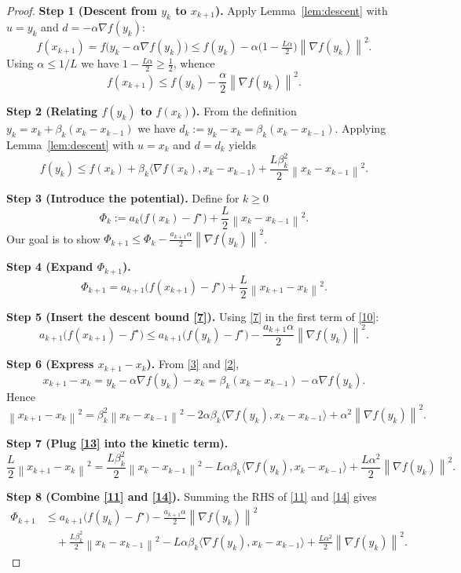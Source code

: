 \documentclass{article}
\newcommand{\norm}[1]{\left\lVert#1\right\rVert}
\newcommand{\grad}{\nabla}
\begin{document}
\begin{proof}
\textbf{Step 1 (Descent from $y_k$ to $x_{k+1}$).}  
Apply Lemma~\ref{lem:descent} with $u=y_k$ and $d=-\alpha\grad f(y_k)$:
\[
f(x_{k+1})
= f\bigl(y_k-\alpha\grad f(y_k)\bigr)
\le f(y_k)-\alpha\bigl(1-\tfrac{L\alpha}{2}\bigr)\norm{\grad f(y_k)}^{2}.
\tag{6}
\]
Using $\alpha\le 1/L$ we have $1-\frac{L\alpha}{2}\ge\frac12$, whence
\[
f(x_{k+1})\le f(y_k)-\frac{\alpha}{2}\norm{\grad f(y_k)}^{2}.
\tag{7}
\]

\textbf{Step 2 (Relating $f(y_k)$ to $f(x_k)$).}  
From the definition $y_k=x_k+\beta_k(x_k-x_{k-1})$ we have
$d_k:=y_k-x_k=\beta_k(x_k-x_{k-1})$.  Applying Lemma~\ref{lem:descent} with
$u=x_k$ and $d=d_k$ yields
\[
f(y_k)\le f(x_k)+\beta_k\langle\grad f(x_k),x_k-x_{k-1}\rangle
+\frac{L\beta_k^{2}}{2}\norm{x_k-x_{k-1}}^{2}.
\tag{8}
\]

\textbf{Step 3 (Introduce the potential).}  
Define for $k\ge0$
\[
\Phi_k:=a_k\bigl(f(x_k)-f^\star\bigr)+\frac{L}{2}\norm{x_k-x_{k-1}}^{2}.
\tag{9}
\]
Our goal is to show $\Phi_{k+1}\le \Phi_k-\frac{a_{k+1}\alpha}{2}\norm{\grad f(y_k)}^{2}$.

\textbf{Step 4 (Expand $\Phi_{k+1}$).}
\[
\Phi_{k+1}=a_{k+1}\bigl(f(x_{k+1})-f^\star\bigr)
+\frac{L}{2}\norm{x_{k+1}-x_k}^{2}.
\tag{10}
\]

\textbf{Step 5 (Insert the descent bound \eqref{7}).}
Using \eqref{7} in the first term of \eqref{10}:
\[
a_{k+1}\bigl(f(x_{k+1})-f^\star\bigr)
\le a_{k+1}\bigl(f(y_k)-f^\star\bigr)
-\frac{a_{k+1}\alpha}{2}\norm{\grad f(y_k)}^{2}.
\tag{11}
\]

\textbf{Step 6 (Express $x_{k+1}-x_k$).}
From \eqref{3} and \eqref{2},
\[
x_{k+1}-x_k
= y_k-\alpha\grad f(y_k)-x_k
= \beta_k(x_k-x_{k-1})-\alpha\grad f(y_k).
\tag{12}
\]
Hence
\[
\norm{x_{k+1}-x_k}^{2}
= \beta_k^{2}\norm{x_k-x_{k-1}}^{2}
-2\alpha\beta_k\langle\grad f(y_k),x_k-x_{k-1}\rangle
+\alpha^{2}\norm{\grad f(y_k)}^{2}.
\tag{13}
\]

\textbf{Step 7 (Plug \eqref{13} into the kinetic term).}
\[
\frac{L}{2}\norm{x_{k+1}-x_k}^{2}
= \frac{L\beta_k^{2}}{2}\norm{x_k-x_{k-1}}^{2}
-L\alpha\beta_k\langle\grad f(y_k),x_k-x_{k-1}\rangle
+\frac{L\alpha^{2}}{2}\norm{\grad f(y_k)}^{2}.
\tag{14}
\]

\textbf{Step 8 (Combine \eqref{11} and \eqref{14}).}
Summing the RHS of \eqref{11} and \eqref{14} gives
\[
\begin{aligned}
\Phi_{k+1}
&\le a_{k+1}\bigl(f(y_k)-f^\star\bigr)
-\frac{a_{k+1}\alpha}{2}\norm{\grad f(y_k)}^{2}\\
&\quad +\frac{L\beta_k^{2}}{2}\norm{x_k-x_{k-1}}^{2}
-L\alpha\beta_k\langle\grad f(y_k),x_k-x_{k-1}\rangle
+\frac{L\alpha^{2}}{2}\norm{\grad f(y_k)}^{2}.
\end{aligned}
\tag{15}
\]


\end{proof}
\end{document}
